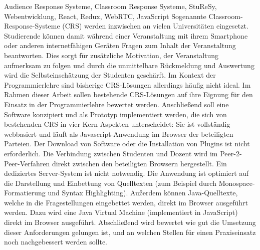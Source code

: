 \documentclass[draft=false
              ,paper=a4
              ,twoside=false
              ,fontsize=11pt
              ,headsepline
              ,BCOR=10mm
              ]{scrbook}
\begin{document}


\frontmatter

\maketitle

\onehalfspacing

\HAWAbstractPage
{Audience Response Systeme, Classroom Response Systeme, StuReSy, Webentwicklung, React, Redux, WebRTC, JavaScript}
{Sogenannte Classroom-Response-Systeme (CRS) werden inzwischen an vielen Universitäten eingesetzt. Studierende können damit während einer Veranstaltung mit ihrem Smartphone oder anderen internetfähigen Geräten Fragen zum Inhalt der Veranstaltung beantworten. Dies sorgt für zusätzliche Motivation, der Veranstaltung aufmerksam zu folgen und durch die unmittelbare Rückmeldung und Auswertung wird die Selbsteinschätzung der Studenten geschärft. Im Kontext der Programmierlehre sind bisherige CRS-Lösungen allerdings häufig nicht ideal. Im Rahmen dieser Arbeit sollen bestehende CRS-Lösungen auf ihre Eignung für den Einsatz in der Programmierlehre bewertet werden. Anschließend soll eine Software konzipiert und als Prototyp implementiert werden, die sich von bestehenden CRS in vier Kern-Aspekten unterscheidet:\newline
Sie ist vollständig webbasiert und läuft als Javascript-Anwendung im Browser der beteiligten Parteien. Der Download von Software oder die Installation von Plugins ist nicht erforderlich.\newline
Die Verbindung zwischen Studenten und Dozent wird im Peer-2-Peer-Verfahren direkt zwischen den beteiligten Browsern hergestellt. Ein dediziertes Server-System ist nicht notwendig.\newline
Die Anwendung ist optimiert auf die Darstellung und Einbettung von Quelltexten (zum Beispiel durch Monospace-Formatierung und Syntax Highlighting).\newline
Außerdem können Java-Quelltexte, welche in die Fragestellungen eingebettet werden, direkt im Browser ausgeführt werden. Dazu wird eine Java Virtual Machine (implementiert in JavaScript) direkt im Browser ausgeführt.\newline
Abschließend wird bewertet wie gut die Umsetzung dieser Anforderungen gelungen ist, und an welchen Stellen für einen Praxiseinsatz noch nachgebessert werden sollte.}
\end{document}
